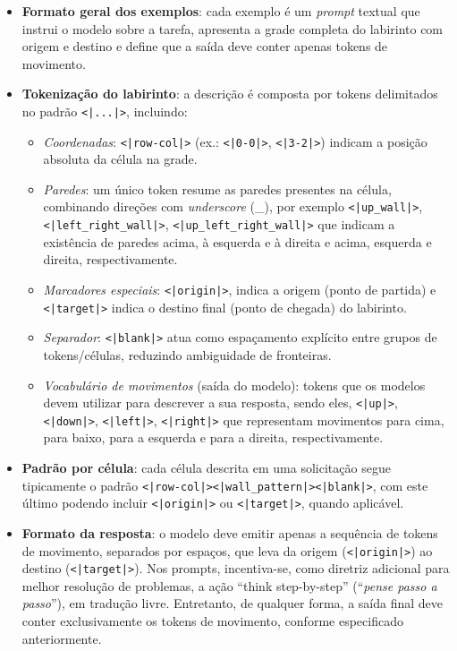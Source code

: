 \begin{itemize}
    \item \textbf{Formato geral dos exemplos}: cada exemplo é um \textit{prompt} textual que instrui o modelo sobre a tarefa, apresenta a grade completa do labirinto com origem e destino e define que a saída deve conter apenas tokens de movimento.

    \item \textbf{Tokenização do labirinto}: a descrição é composta por tokens delimitados no padrão \verb!<|...|>!, incluindo:
    \begin{itemize}
        \item \textit{Coordenadas}: \verb!<|row-col|>! (ex.: \verb!<|0-0|>!, \verb!<|3-2|>!) indicam a posição absoluta da célula na grade.
        \item \textit{Paredes}: um único token resume as paredes presentes na célula, combinando direções com \textit{underscore} (\_), por exemplo \verb!<|up_wall|>!, \verb!<|left_right_wall|>!, \verb!<|up_left_right_wall|>! que indicam a existência de paredes acima, à esquerda e à direita e acima, esquerda e direita, respectivamente.
        \item \textit{Marcadores especiais}: \verb!<|origin|>!, indica a origem (ponto de partida) e \verb!<|target|>! indica o destino final (ponto de chegada) do labirinto.
        \item \textit{Separador}: \verb!<|blank|>! atua como espaçamento explícito entre grupos de tokens/células, reduzindo ambiguidade de fronteiras.
        \item \textit{Vocabulário de movimentos} (saída do modelo): tokens que os modelos devem utilizar para descrever a sua resposta, sendo eles, \verb!<|up|>!, \verb!<|down|>!, \verb!<|left|>!, \verb!<|right|>! que representam movimentos para cima, para baixo, para a esquerda e para a direita, respectivamente.
    \end{itemize}

    \item \textbf{Padrão por célula}: cada célula descrita em uma solicitação segue tipicamente o padrão \verb!<|row-col|><|wall_pattern|><|blank|>!, com este último podendo incluir \verb!<|origin|>! ou \verb!<|target|>!, quando aplicável.
    
    \item \textbf{Formato da resposta}: o modelo deve emitir apenas a sequência de tokens de movimento, separados por espaços, que leva da origem (\verb!<|origin|>!) ao destino (\verb!<|target|>!). Nos prompts, incentiva-se, como diretriz adicional para melhor resolução de problemas, a ação ``think step-by-step'' (``\textit{pense passo a passo}''), em tradução livre. Entretanto, de qualquer forma, a saída final deve conter exclusivamente os tokens de movimento, conforme especificado anteriormente.
\end{itemize}

